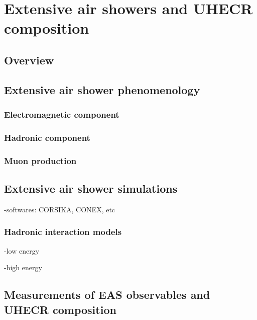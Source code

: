 \chapter[Extensive air showers and UHECR composition]{Extensive air showers and UHECR composition}
\label{sec:showers}


\section{Overview}


\section{Extensive air shower phenomenology}
\label{sec:showers:phen}

\subsection{Electromagnetic component}
\label{sec:showers:phen:em}

\subsection{Hadronic component}
\label{sec:showers:phen:had}

\subsection{Muon production}
\label{sec:showers:phen:muon}


\section{Extensive air shower simulations}

-softwares: CORSIKA, CONEX, etc

\subsection{Hadronic interaction models}

-low energy

-high energy

\section{Measurements of EAS observables and UHECR composition}


